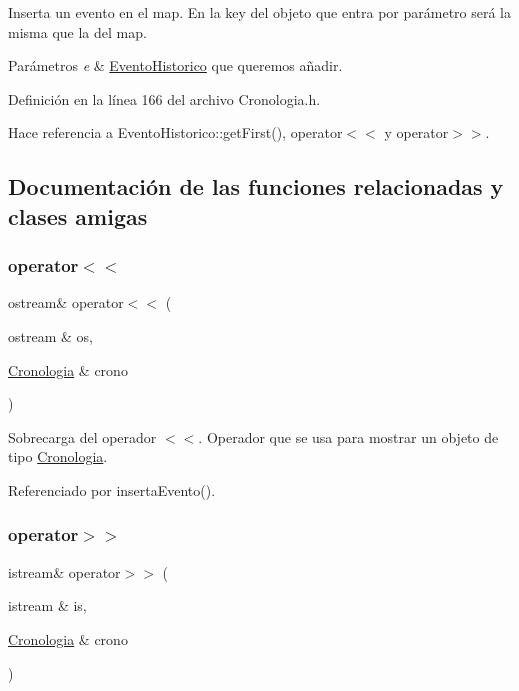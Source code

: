 Inserta un evento en el map. En la key del objeto que entra por parámetro será la misma que la del map. 


\begin{DoxyParams}{Parámetros}
{\em e} & \hyperlink{classEventoHistorico}{Evento\+Historico} que queremos añadir. \\
\hline
\end{DoxyParams}


Definición en la línea 166 del archivo Cronologia.\+h.



Hace referencia a Evento\+Historico\+::get\+First(), operator$<$$<$ y operator$>$$>$.



\subsection{Documentación de las funciones relacionadas y clases amigas}
\hypertarget{classCronologia_a17fd606eac01e5f072ee997137115668}{}\label{classCronologia_a17fd606eac01e5f072ee997137115668} 
\subsubsection{\texorpdfstring{operator$<$$<$}{operator<<}}
{\footnotesize\ttfamily ostream\& operator$<$$<$ (\begin{DoxyParamCaption}\item[{ostream \&}]{os,  }\item[{\hyperlink{classCronologia}{Cronologia} \&}]{crono }\end{DoxyParamCaption})\hspace{0.3cm}{\ttfamily [friend]}}



Sobrecarga del operador $<$$<$. Operador que se usa para mostrar un objeto de tipo \hyperlink{classCronologia}{Cronologia}. 



Referenciado por inserta\+Evento().

\hypertarget{classCronologia_a32b7d5d955c9ddc781947fca308fa32e}{}\label{classCronologia_a32b7d5d955c9ddc781947fca308fa32e} 
\subsubsection{\texorpdfstring{operator$>$$>$}{operator>>}}
{\footnotesize\ttfamily istream\& operator$>$$>$ (\begin{DoxyParamCaption}\item[{istream \&}]{is,  }\item[{\hyperlink{classCronologia}{Cronologia} \&}]{crono }\end{DoxyParamCaption})\hspace{0.3cm}{\ttfamily [friend]}}



